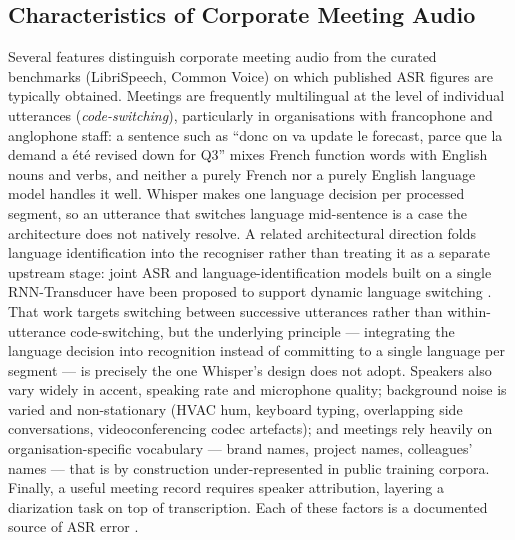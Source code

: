 \documentclass[12pt]{report}
\begin{document}
\subsection{Characteristics of Corporate Meeting Audio}
Several features distinguish corporate meeting audio from the curated benchmarks (LibriSpeech, Common Voice) on which published ASR figures are typically obtained. Meetings are frequently multilingual at the level of individual utterances (\textit{code-switching}), particularly in organisations with francophone and anglophone staff: a sentence such as \enquote{donc on va update le forecast, parce que la demand a été revised down for Q3} mixes French function words with English nouns and verbs, and neither a purely French nor a purely English language model handles it well. Whisper makes one language decision per processed segment, so an utterance that switches language mid-sentence is a case the architecture does not natively resolve. A related architectural direction folds language identification into the recogniser rather than treating it as a separate upstream stage: joint ASR and language-identification models built on a single RNN-Transducer have been proposed to support dynamic language switching \cite{punjabi2021joint}. That work targets switching between successive utterances rather than within-utterance code-switching, but the underlying principle --- integrating the language decision into recognition instead of committing to a single language per segment --- is precisely the one Whisper's design does not adopt. Speakers also vary widely in accent, speaking rate and microphone quality; background noise is varied and non-stationary (HVAC hum, keyboard typing, overlapping side conversations, videoconferencing codec artefacts); and meetings rely heavily on organisation-specific vocabulary --- brand names, project names, colleagues' names --- that is by construction under-represented in public training corpora. Finally, a useful meeting record requires speaker attribution, layering a diarization task on top of transcription. Each of these factors is a documented source of ASR error \cite{farahani2017autocorrelation,yoshioka2019advances}.
\end{document}
